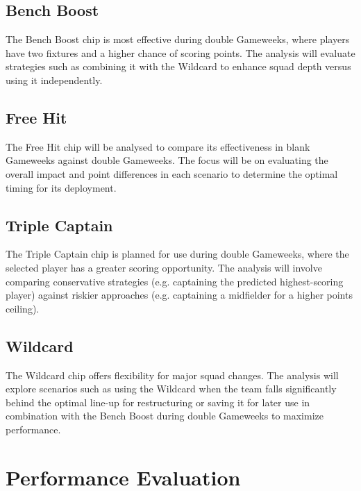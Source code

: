 \subsection{Bench Boost}
The Bench Boost chip is most effective during double Gameweeks, where players have two fixtures and a higher chance of scoring points. The analysis will evaluate strategies such as combining it with the Wildcard to enhance squad depth versus using it independently.

\subsection{Free Hit}
The Free Hit chip will be analysed to compare its effectiveness in blank Gameweeks against double Gameweeks. The focus will be on evaluating the overall impact and point differences in each scenario to determine the optimal timing for its deployment.

\subsection{Triple Captain}
The Triple Captain chip is planned for use during double Gameweeks, where the selected player has a greater scoring opportunity. The analysis will involve comparing conservative strategies (e.g. captaining the predicted highest-scoring player) against riskier approaches (e.g. captaining a midfielder for a higher points ceiling).

\subsection{Wildcard}
The Wildcard chip offers flexibility for major squad changes. The analysis will explore scenarios such as using the Wildcard when the team falls significantly behind the optimal line-up for restructuring or saving it for later use in combination with the Bench Boost during double Gameweeks to maximize performance.



\section{Performance Evaluation}

